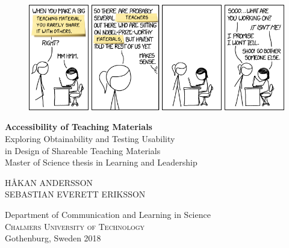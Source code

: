 
\begin{titlepage}
			
\addtolength{\voffset}{2cm}

\begin{figure}[H]
\centering
\vspace{2cm}	%
\includegraphics[width=\linewidth]{figure/xkcd.png}
\end{figure}

\mbox{}
\vfill
\renewcommand{\familydefault}{\sfdefault} \normalfont %
\textbf{{\Huge Accessibility of Teaching Materials 	}} 	\\[0.5cm]
{\Large Exploring Obtainability and Testing Usability \\[0.1cm] in Design of Shareable Teaching Materials}\\[0.5cm]
Master of Science thesis in Learning and Leadership \setlength{\parskip}{1cm}

{\Large HÅKAN ANDERSSON \\[0.2cm] SEBASTIAN EVERETT ERIKSSON} \setlength{\parskip}{2.9cm}

Department of Communication and Learning in Science \\
\textsc{Chalmers University of Technology} \\
Gothenburg, Sweden 2018

\renewcommand{\familydefault}{\rmdefault} \normalfont %
\end{titlepage}


\newpage
\restoregeometry
\thispagestyle{empty}
\mbox{}


